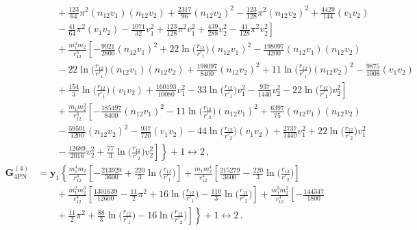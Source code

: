 \documentclass[prd,preprint,superscriptaddress,tightenlines,nofootinbib,
  eqsecnum,showpacs]{revtex4}
\begin{document}
\begin{subequations}
\begin{align}
& \qquad + \frac{123}{64} \pi^2 (n_{12} v_1) (n_{12} v_2)
 + \frac{2317}{96} (n_{12} v_2)^2
 -  \frac{123}{128} \pi^2 (n_{12} v_2)^2
 + \frac{4429}{144} (v_1 v_2)\nonumber\\
& \left. \qquad -  \frac{41}{64} \pi^2 (v_1 v_2)
 -  \frac{1071}{32} v_1^{2}
 + \frac{123}{128} \pi^2 v_1^{2}
 + \frac{439}{288} v_2^{2}
 -  \frac{41}{128} \pi^2 v_2^{2}\right]\nonumber\\
& \qquad + \frac{m_{1}^3 m_{2}}{r_{12}^3} \left[- \frac{9921}{2800} (n_{12} v_1)^2
 + 22 \ln\Big(\frac{r_{12}}{r'_{1}}\Big) (n_{12} v_1)^2
 -  \frac{198097}{4200} (n_{12} v_1) (n_{12} v_2) \right. \nonumber\\
& \qquad - 22 \ln\Big(\frac{r_{12}}{r'_{1}}\Big) (n_{12} v_1) (n_{12} v_2)
 + \frac{198097}{8400} (n_{12} v_2)^2
 + 11 \ln\Big(\frac{r_{12}}{r'_{1}}\Big) (n_{12} v_2)^2
 -  \frac{9875}{1008} (v_1 v_2)\nonumber\\
& \left. \qquad + \frac{154}{3} \ln\Big(\frac{r_{12}}{r'_{1}}\Big) (v_1 v_2)
 + \frac{160193}{10080} v_1^{2}
 - 33 \ln\Big(\frac{r_{12}}{r'_{1}}\Big) v_1^{2}
 -  \frac{937}{1440} v_2^{2}
 - 22 \ln\Big(\frac{r_{12}}{r'_{1}}\Big) v_2^{2}\right]\nonumber\\
& \qquad + \frac{m_{1} m_{2}^3}{r_{12}^3} \left[- \frac{185497}{8400} (n_{12} v_1)^2
 - 11 \ln\Big(\frac{r_{12}}{r'_{2}}\Big) (n_{12} v_1)^2
 + \frac{6397}{75} (n_{12} v_1) (n_{12} v_2) \right. \nonumber\\
& \qquad -  \frac{59501}{1200} (n_{12} v_2)^2
 -  \frac{937}{720} (v_1 v_2)
 - 44 \ln\Big(\frac{r_{12}}{r'_{2}}\Big) (v_1 v_2)
 + \frac{2737}{1440} v_1^{2}
 + 22 \ln\Big(\frac{r_{12}}{r'_{2}}\Big) v_1^{2}\nonumber\\
& \left. \left. \qquad -  \frac{12689}{2016} v_2^{2}
 + \frac{77}{3} \ln\Big(\frac{r_{12}}{r'_{2}}\Big) v_2^{2}\right]\right\} 
+ 1 \leftrightarrow 2\,,\\
\bm{G}^{(4)}_\text{4PN} &=  \bm{y}_1 \left\{\frac{m_{1}^4 m_{2}}{r_{12}^4} 
\left[- \frac{213929}{3600}
 + \frac{220}{3} \ln\Big(\frac{r_{12}}{r'_{1}}\Big)\right]
 + \frac{m_{1} m_{2}^4}{r_{12}^4} \left[\frac{215279}{3600}
 -  \frac{220}{3} \ln\Big(\frac{r_{12}}{r'_{2}}\Big)\right] \right. \nonumber\\
& \qquad + \frac{m_{1}^2 m_{2}^3}{r_{12}^4} \left[\frac{1301639}{12600}
 -  \frac{11}{2} \pi^2
 + 16 \ln\Big(\frac{r_{12}}{r'_{1}}\Big)
 -  \frac{110}{3} \ln\Big(\frac{r_{12}}{r'_{2}}\Big)\right]
 + \frac{m_{1}^3 m_{2}^2}{r_{12}^4} \left[- \frac{144347}{1800} \right. \nonumber\\
& \left. \left. \qquad + \frac{11}{2} \pi^2
 + \frac{88}{3} \ln\Big(\frac{r_{12}}{r'_{1}}\Big)
 - 16 \ln\Big(\frac{r_{12}}{r'_{2}}\Big)\right]\right\} + 1 \leftrightarrow 2\,.
\end{align}
\end{subequations}
%
\end{document}
